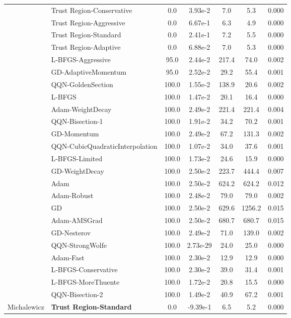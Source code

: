 \documentclass{article}
\begin{document}
\begin{table}[htbp]
{\begin{tabular}{p{2.5cm}p{2.5cm}*{5}{c}}
 & Trust Region-Conservative & 0.0 & 3.93e-2 & 7.0 & 5.3 & 0.000 \\
 & Trust Region-Aggressive & 0.0 & 6.67e-1 & 6.3 & 4.9 & 0.000 \\
 & Trust Region-Standard & 0.0 & 2.41e-1 & 7.2 & 5.5 & 0.000 \\
 & Trust Region-Adaptive & 0.0 & 6.88e-2 & 7.0 & 5.3 & 0.000 \\
 & L-BFGS-Aggressive & 95.0 & 2.44e-2 & 217.4 & 74.0 & 0.002 \\
 & GD-AdaptiveMomentum & 95.0 & 2.52e-2 & 29.2 & 55.4 & 0.001 \\
 & QQN-GoldenSection & 100.0 & 1.55e-2 & 138.9 & 20.6 & 0.002 \\
 & L-BFGS & 100.0 & 1.47e-2 & 20.1 & 16.4 & 0.000 \\
 & Adam-WeightDecay & 100.0 & 2.49e-2 & 221.4 & 221.4 & 0.004 \\
 & QQN-Bisection-1 & 100.0 & 1.91e-2 & 34.2 & 70.2 & 0.001 \\
 & GD-Momentum & 100.0 & 2.49e-2 & 67.2 & 131.3 & 0.002 \\
 & QQN-CubicQuadraticInterpolation & 100.0 & 1.07e-2 & 34.0 & 37.6 & 0.001 \\
 & L-BFGS-Limited & 100.0 & 1.73e-2 & 24.6 & 15.9 & 0.000 \\
 & GD-WeightDecay & 100.0 & 2.50e-2 & 223.7 & 444.4 & 0.007 \\
 & Adam & 100.0 & 2.50e-2 & 624.2 & 624.2 & 0.012 \\
 & Adam-Robust & 100.0 & 2.48e-2 & 79.0 & 79.0 & 0.002 \\
 & GD & 100.0 & 2.50e-2 & 629.6 & 1256.2 & 0.015 \\
 & Adam-AMSGrad & 100.0 & 2.50e-2 & 680.7 & 680.7 & 0.015 \\
 & GD-Nesterov & 100.0 & 2.49e-2 & 71.0 & 139.0 & 0.002 \\
 & QQN-StrongWolfe & 100.0 & 2.73e-29 & 24.0 & 25.0 & 0.000 \\
 & Adam-Fast & 100.0 & 2.30e-2 & 12.9 & 12.9 & 0.000 \\
 & L-BFGS-Conservative & 100.0 & 2.30e-2 & 39.0 & 31.4 & 0.001 \\
 & L-BFGS-MoreThuente & 100.0 & 1.72e-2 & 20.8 & 15.5 & 0.000 \\
 & QQN-Bisection-2 & 100.0 & 1.49e-2 & 40.9 & 67.2 & 0.001 \\
\midrule
\multirow{25}{*}{Michalewicz} & \textbf{Trust Region-Standard} & 0.0 & -9.39e-1 & 6.5 & 5.2 & 0.000 \\

\end{tabular}}
\end{table}
\end{document}
